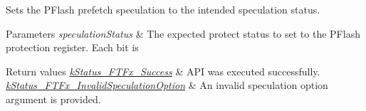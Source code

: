 Sets the P\+Flash prefetch speculation to the intended speculation status. 


\begin{DoxyParams}{Parameters}
{\em speculation\+Status} & The expected protect status to set to the P\+Flash protection register. Each bit is \\
\hline
\end{DoxyParams}

\begin{DoxyRetVals}{Return values}
{\em \mbox{\hyperlink{group__ftfx__controller_gga458e651af6690959efa2afb96be7d609a8825e5cb3b30edfd6a26897eef4c66a3}{k\+Status\+\_\+\+F\+T\+Fx\+\_\+\+Success}}} & A\+PI was executed successfully. \\
\hline
{\em \mbox{\hyperlink{group__ftfx__controller_gga458e651af6690959efa2afb96be7d609ab985d0a6c5a30e7bda837a04ce61dcc7}{k\+Status\+\_\+\+F\+T\+Fx\+\_\+\+Invalid\+Speculation\+Option}}} & An invalid speculation option argument is provided. \\
\hline
\end{DoxyRetVals}
